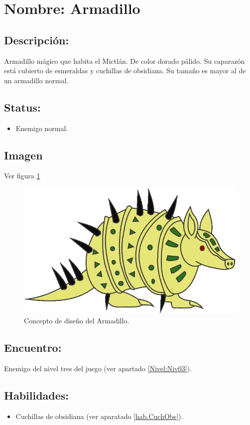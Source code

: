 \section{Nombre: Armadillo}  \label{per:armadillo} 
\subsection{Descripción:}
Armadillo mágico que habita el Mictlán. De color dorado pálido. Su caparazón está cubierto de esmeraldas y cuchillas de obsidiana. Su tamaño es mayor al de un armadillo normal. 
\subsection{Status:}
\begin{itemize}
	\item Enemigo normal.
\end{itemize}
\subsection{Imagen}
Ver figura \ref{fig:armadillo}
\begin{figure}
	\centering
	\includegraphics[height=0.2 \textheight]{Imagenes/armadillo}
	\caption{Concepto de diseño del Armadillo.}
	\label{fig:armadillo}
\end{figure} 

\subsection{Encuentro:}
Enemigo del nivel tres del juego (ver apartado \ref{Nivel:Niv03}).
\subsection{Habilidades:}
\begin{itemize}
	\item Cuchillas de obsidiana (ver aparatado \ref{hab.CuchObs}).
\end{itemize}
